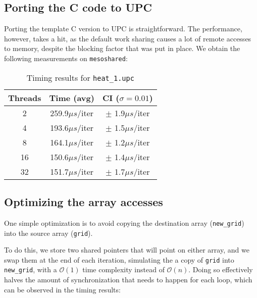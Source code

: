 \documentclass[12pt]{article}
\newcommand{\us}[0]{${\mu}s$}
\begin{document}


\subsection{Porting the C code to UPC}

Porting the template C version to UPC is straightforward.
The performance, however, takes a hit, as the default work sharing causes a lot of remote accesses to memory, despite the blocking factor that was put in place.
We obtain the following measurements on \texttt{mesoshared}:



\begin{table}[ht]
  \centering\begin{tabular}{|c|c|c|}
    \hline
    Threads & Time (avg) & CI ($\sigma=0.01$) \\
    \hline
    2 & 259.9\us/iter & $\pm$ 1.9\us/iter \\
    4 & 193.6\us/iter & $\pm$ 1.5\us/iter \\
    8 & 164.1\us/iter & $\pm$ 1.2\us/iter \\
    16 & 150.6\us/iter & $\pm$ 1.4\us/iter \\
    32 & 151.7\us/iter & $\pm$ 1.7\us/iter \\
    \hline
  \end{tabular}
  \caption{Timing results for \texttt{heat\_1.upc}}
  \label{tab:heat1}
\end{table}

\subsection{Optimizing the array accesses}

One simple optimization is to avoid copying the destination array (\texttt{new\_grid}) into the source array (\texttt{grid}).

To do this, we store two shared pointers that will point on either array, and we swap them at the end of each iteration, simulating the a copy of \texttt{grid} into \texttt{new\_grid}, with a $\mathcal{O}(1)$ time complexity instead of $\mathcal{O}(n)$.
Doing so effectively halves the amount of synchronization that needs to happen for each loop, which can be observed in the timing results:
\end{document}
